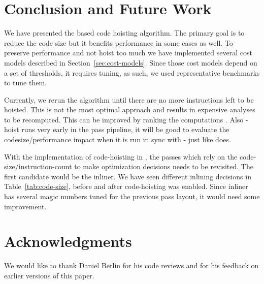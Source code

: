\documentclass{sig-alternate}
\begin{document}
\section{Conclusion and Future Work}
\label{sec:future-work}
We have presented the \GVN{} based code hoisting algorithm. The primary goal is to
reduce the code size but it benefits performance in some cases as well. To
preserve performance and not hoist too much we have implemented several cost
models described in Section~\ref{sec:cost-models}. Since those cost models
depend on a set of thresholds, it requires tuning, as such, we used
representative benchmarks to tune them.

Currently, we rerun the algorithm until there are no more instructions left to
be hoisted. This is not the most optimal approach and results in expensive
analyses to be recomputed. This can be improved by ranking the computations
\cite{rosen1988global}. Also \GVN{}-hoist runs very early in the pass pipeline, it
will be good to evaluate the codesize/performance impact when it is run in sync
with \GVN{}-\PRE{} just like \GCC{} does.

With the implementation of code-hoisting in \LLVM{}, the passes which rely on the
code-size/instruction-count to make optimization decisions needs to be
revisited. The first candidate would be the inliner. We have seen different
inlining decisions in Table~\ref{tab:code-size}, before and after
code-hoisting was enabled.  Since inliner has several magic numbers tuned for
the previous pass layout, it would need some improvement.

\section{Acknowledgments}
We would like to thank Daniel Berlin for his code reviews and for his feedback
on earlier versions of this paper.


{\small

}
\end{document}
